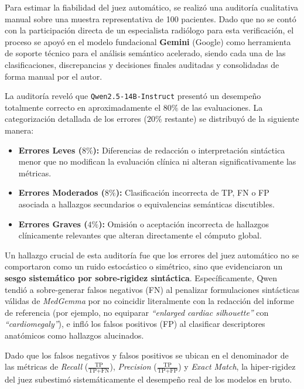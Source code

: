 \documentclass[../tesis.tex]{subfiles}
\begin{document}
Para estimar la fiabilidad del juez automático, se realizó una auditoría cualitativa manual sobre una muestra representativa de 100 pacientes. Dado que no se contó con la participación directa de un especialista radiólogo para esta verificación, el proceso se apoyó en el modelo fundacional \textbf{Gemini} (Google) como herramienta de soporte técnico para el análisis semántico acelerado, siendo cada una de las clasificaciones, discrepancias y decisiones finales auditadas y consolidadas de forma manual por el autor.

La auditoría reveló que \texttt{Qwen2.5-14B-Instruct} presentó un desempeño totalmente correcto en aproximadamente el $80\%$ de las evaluaciones. La categorización detallada de los errores ($20\%$ restante) se distribuyó de la siguiente manera:
\begin{itemize}
    \item \textbf{Errores Leves ($8\%$):} Diferencias de redacción o interpretación sintáctica menor que no modifican la evaluación clínica ni alteran significativamente las métricas.
    \item \textbf{Errores Moderados ($8\%$):} Clasificación incorrecta de TP, FN o FP asociada a hallazgos secundarios o equivalencias semánticas discutibles.
    \item \textbf{Errores Graves ($4\%$):} Omisión o aceptación incorrecta de hallazgos clínicamente relevantes que alteran directamente el cómputo global.
\end{itemize}

Un hallazgo crucial de esta auditoría fue que los errores del juez automático no se comportaron como un ruido estocástico o simétrico, sino que evidenciaron un \textbf{sesgo sistemático por sobre-rigidez sintáctica}. Específicamente, Qwen tendió a sobre-generar falsos negativos (FN) al penalizar formulaciones sintácticas válidas de \textit{MedGemma} por no coincidir literalmente con la redacción del informe de referencia (por ejemplo, no equiparar \textit{``enlarged cardiac silhouette''} con \textit{``cardiomegaly''}), e infló los falsos positivos (FP) al clasificar descriptores anatómicos como hallazgos alucinados.

Dado que los falsos negativos y falsos positivos se ubican en el denominador de las métricas de \textit{Recall} ($\frac{\text{TP}}{\text{TP} + \text{FN}}$), \textit{Precision} ($\frac{\text{TP}}{\text{TP} + \text{FP}}$) y \textit{Exact Match}, la hiper-rigidez del juez subestimó sistemáticamente el desempeño real de los modelos en bruto.
\end{document}
